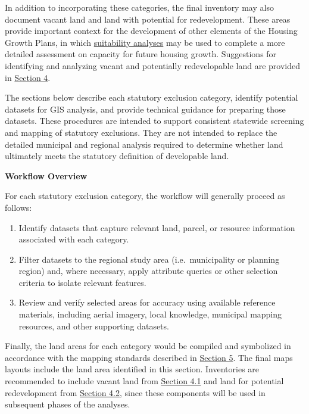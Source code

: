 \documentclass[
  letterpaper,
  DIV=11,
  numbers=noendperiod]{scrreprt}
\providecommand{\tightlist}{%
  \setlength{\itemsep}{0pt}\setlength{\parskip}{0pt}}
\begin{document}
In addition to incorporating these categories, the final inventory may
also document vacant land and land with potential for redevelopment.
These areas provide important context for the development of other
elements of the Housing Growth Plans, in which
\href{https://housingmaps.ct.gov/pages/suitability-analysis}{suitability
analyses} may be used to complete a more detailed assessment on capacity
for future housing growth. Suggestions for identifying and analyzing
vacant and potentially redevelopable land are provided in
\hyperref[0]{Section 4}.

The sections below describe each statutory exclusion category, identify
potential datasets for GIS analysis, and provide technical guidance for
preparing those datasets. These procedures are intended to support
consistent statewide screening and mapping of statutory exclusions. They
are not intended to replace the detailed municipal and regional analysis
required to determine whether land ultimately meets the statutory
definition of developable land.

\textbf{Workflow Overview}

For each statutory exclusion category, the workflow will generally
proceed as follows:

\begin{enumerate}
\def\labelenumi{\arabic{enumi}.}
\tightlist
\item
  Identify datasets that capture relevant land, parcel, or resource
  information associated with each category.
\item
  Filter datasets to the regional study area (i.e.~municipality or
  planning region) and, where necessary, apply attribute queries or
  other selection criteria to isolate relevant features.
\item
  Review and verify selected areas for accuracy using available
  reference materials, including aerial imagery, local knowledge,
  municipal mapping resources, and other supporting datasets.
\end{enumerate}

Finally, the land areas for each category would be compiled and
symbolized in accordance with the mapping standards described in
\href{map.qmd}{Section 5}. The final maps layouts include the land area
identified in this section. Inventories are recommended to include
vacant land from \href{vac_redev.qmd}{Section 4.1} and land for
potential redevelopment from \href{vac_redev.qmd}{Section 4.2}, since
these components will be used in subsequent phases of the analyses.
\end{document}
